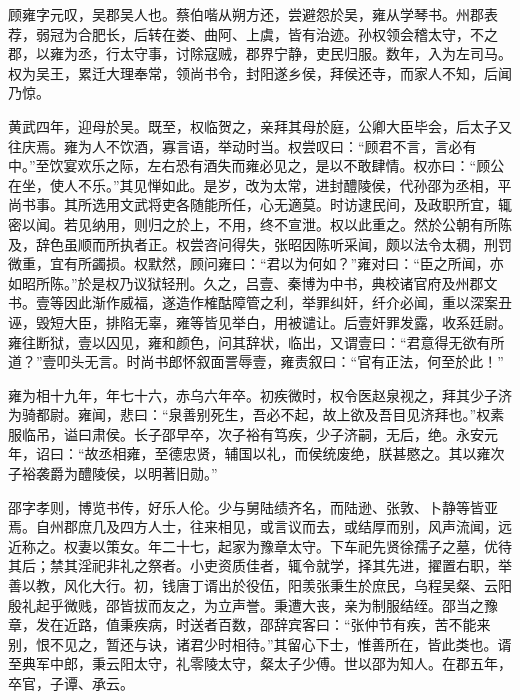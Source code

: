\documentclass[12pt,UTF8]{ctexbook}
\begin{document}
顾雍字元叹，吴郡吴人也。蔡伯喈从朔方还，尝避怨於吴，雍从学琴书。州郡表荐，弱冠为合肥长，后转在娄、曲阿、上虞，皆有治迹。孙权领会稽太守，不之郡，以雍为丞，行太守事，讨除寇贼，郡界宁静，吏民归服。数年，入为左司马。权为吴王，累迁大理奉常，领尚书令，封阳遂乡侯，拜侯还寺，而家人不知，后闻乃惊。

黄武四年，迎母於吴。既至，权临贺之，亲拜其母於庭，公卿大臣毕会，后太子又往庆焉。雍为人不饮酒，寡言语，举动时当。权尝叹曰：“顾君不言，言必有中。”至饮宴欢乐之际，左右恐有酒失而雍必见之，是以不敢肆情。权亦曰：“顾公在坐，使人不乐。”其见惮如此。是岁，改为太常，进封醴陵侯，代孙邵为丞相，平尚书事。其所选用文武将吏各随能所任，心无適莫。时访逮民间，及政职所宜，辄密以闻。若见纳用，则归之於上，不用，终不宣泄。权以此重之。然於公朝有所陈及，辞色虽顺而所执者正。权尝咨问得失，张昭因陈听采闻，颇以法令太稠，刑罚微重，宜有所蠲损。权默然，顾问雍曰：“君以为何如？”雍对曰：“臣之所闻，亦如昭所陈。”於是权乃议狱轻刑。久之，吕壹、秦博为中书，典校诸官府及州郡文书。壹等因此渐作威福，遂造作榷酤障管之利，举罪纠奸，纤介必闻，重以深案丑诬，毁短大臣，排陷无辜，雍等皆见举白，用被谴让。后壹奸罪发露，收系廷尉。雍往断狱，壹以囚见，雍和颜色，问其辞状，临出，又谓壹曰：“君意得无欲有所道？”壹叩头无言。时尚书郎怀叙面詈辱壹，雍责叙曰：“官有正法，何至於此！”

雍为相十九年，年七十六，赤乌六年卒。初疾微时，权令医赵泉视之，拜其少子济为骑都尉。雍闻，悲曰：“泉善别死生，吾必不起，故上欲及吾目见济拜也。”权素服临吊，谥曰肃侯。长子邵早卒，次子裕有笃疾，少子济嗣，无后，绝。永安元年，诏曰：“故丞相雍，至德忠贤，辅国以礼，而侯统废绝，朕甚愍之。其以雍次子裕袭爵为醴陵侯，以明著旧勋。”

邵字孝则，博览书传，好乐人伦。少与舅陆绩齐名，而陆逊、张敦、卜静等皆亚焉。自州郡庶几及四方人士，往来相见，或言议而去，或结厚而别，风声流闻，远近称之。权妻以策女。年二十七，起家为豫章太守。下车祀先贤徐孺子之墓，优待其后；禁其淫祀非礼之祭者。小吏资质佳者，辄令就学，择其先进，擢置右职，举善以教，风化大行。初，钱唐丁谞出於役伍，阳羡张秉生於庶民，乌程吴粲、云阳殷礼起乎微贱，邵皆拔而友之，为立声誉。秉遭大丧，亲为制服结绖。邵当之豫章，发在近路，值秉疾病，时送者百数，邵辞宾客曰：“张仲节有疾，苦不能来别，恨不见之，暂还与诀，诸君少时相待。”其留心下士，惟善所在，皆此类也。谞至典军中郎，秉云阳太守，礼零陵太守，粲太子少傅。世以邵为知人。在郡五年，卒官，子谭、承云。
\end{document}
